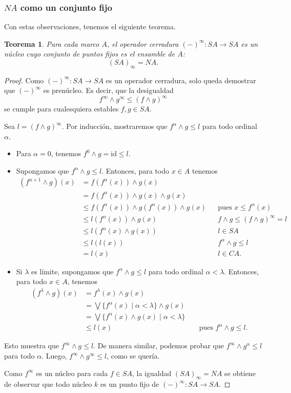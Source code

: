 \documentclass[12pt,letterpaper,titlepage]{article}
\newtheorem{thm}{Teorema}
\theoremstyle{definition}
\newcommand\Sup{\bigvee}
\renewcommand\inf{\wedge}
\newcommand\tps[2]{\texorpdfstring{#1}{#2}}
\newcommand\<{\langle}
\renewcommand\>{\rangle}
\newcommand{\id}{\mathrm{id}}
\begin{document}
\subsubsection{\tps{$NA$}{NA} como un conjunto fijo}
Con estas observaciones, tenemos el siguiente teorema.
\begin{thm}
  Para cada marco $A$, el operador cerradura $({-})^\infty:SA\to
  SA$ es un núcleo cuyo conjunto de puntos fijos es el ensamble
  de $A$:
  \[
    (SA)_\infty = NA
  .\]
\end{thm}
\begin{proof}
  Como $({-})^\infty:SA\to SA$ es un operador cerradura,
  solo queda demostrar que $(-)^\infty$ es prenúcleo.
  Es decir, que la desigualdad
  \[
    f^\infty \inf g^\infty \leq (f\inf g)^\infty
  \]
  se cumple para cualesquiera estables $f,g\in SA$.

  Sea $l=(f \inf g)^\infty$.
  Por inducción, mostraremos que $f^\alpha\inf g\leq l$ para todo
  ordinal $\alpha$.
  \begin{itemize}
    \item Para $\alpha=0$, tenemos $f^0\inf g=\id \leq l$.
    \item Supongamos que $f^\alpha\inf g\leq l$.
    Entonces, para todo $x\in A$ tenemos
    \begin{align*}
      (f^{\alpha+1}\inf g)(x)
      &= f(f^\alpha(x)) \inf g(x) \\
      &= f(f^\alpha(x)) \inf g(x) \inf g(x) \\
      &\leq f(f^\alpha(x)) \inf g(f^\alpha(x)) \inf g(x)
        && \text{pues } x\leq f^\alpha(x) \\
      &\leq l(f^\alpha(x)) \inf g(x) && f\inf g\leq (f\inf
      g)^\infty =l \\
      &\leq l(f^\alpha(x) \inf g(x)) && l\in SA \\
      &\leq l(l(x)) && f^\alpha\inf g\leq l \\
      &= l(x) && l\in CA.
    \end{align*}
    \item
    Si $\lambda$ es límite, supongamos que $f^\alpha\inf g\leq l$
    para todo ordinal $\alpha <\lambda$.
    Entonces, para todo $x\in A$, tenemos
    \begin{align*}
      (f^\lambda\inf g)(x)
      &= f^\lambda(x) \inf g(x) \\
      &= \Sup\{f^\alpha(x) \mid \alpha<\lambda\} \inf g(x) \\
      &= \Sup\{f^\alpha(x)\inf g(x) \mid \alpha<\lambda\} \\
      &\leq l(x) && \text{ pues } f^\alpha\inf g\leq l.
    \end{align*}
  \end{itemize}
  Esto muestra que $f^\infty \inf g\leq l$.
  De manera similar, podemos probar que $f^\infty \inf
  g^\alpha\leq l$ para todo $\alpha$.
  Luego, $f^\infty \inf g^\infty \leq l$, como se quería.

  Como $f^\infty$ es un núcleo para cada $f\in SA$, la
  igualdad $(SA)_\infty=NA$ se obtiene de observar que todo
  núcleo $k$ es un punto fijo de $({-})^\infty:SA\to SA$.
\end{proof}
\end{document}

